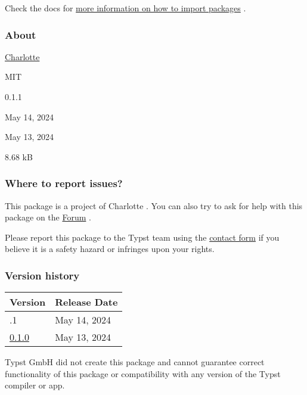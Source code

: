 Check the docs for
\href{https://typst.app/docs/reference/scripting/\#packages}{more
information on how to import packages} .

\subsubsection{About}\label{about}

\begin{description}
\tightlist
\item[Author :]
\href{https://cza.li}{Charlotte}
\item[License:]
MIT
\item[Current version:]
0.1.1
\item[Last updated:]
May 14, 2024
\item[First released:]
May 13, 2024
\item[Archive size:]
8.68 kB
\href{https://packages.typst.org/preview/structogrammer-0.1.1.tar.gz}{\pandocbounded{}}
\end{description}

\subsubsection{Where to report issues?}\label{where-to-report-issues}

This package is a project of Charlotte . You can also try to ask for
help with this package on the \href{https://forum.typst.app}{Forum} .

Please report this package to the Typst team using the
\href{https://typst.app/contact}{contact form} if you believe it is a
safety hazard or infringes upon your rights.

\label{versions}
\subsubsection{Version history}\label{version-history}

\begin{longtable}[]{@{}ll@{}}
\toprule\noalign{}
Version & Release Date \\
\midrule\noalign{}
\endhead
\bottomrule\noalign{}
\endlastfoot
0.1.1 & May 14, 2024 \\
\href{https://typst.app/universe/package/structogrammer/0.1.0/}{0.1.0} &
May 13, 2024 \\
\end{longtable}

Typst GmbH did not create this package and cannot guarantee correct
functionality of this package or compatibility with any version of the
Typst compiler or app.
